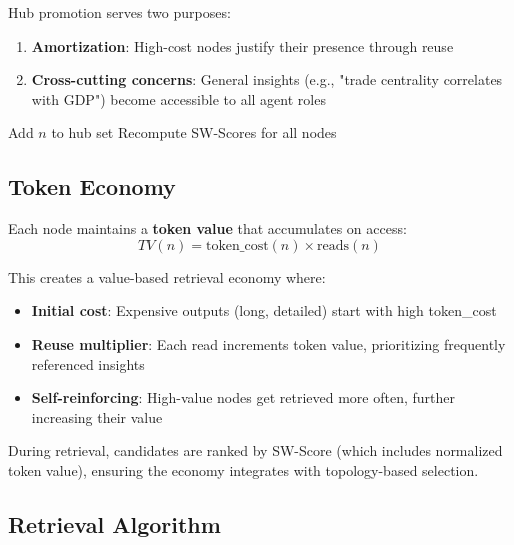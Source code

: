 \documentclass[11pt]{article}
\begin{document}
Hub promotion serves two purposes:
\begin{enumerate}
    \item \textbf{Amortization}: High-cost nodes justify their presence through reuse
    \item \textbf{Cross-cutting concerns}: General insights (e.g., "trade centrality correlates with GDP") become accessible to all agent roles
\end{enumerate}

\begin{algorithm}
\caption{Hub Promotion (called at epoch boundaries)}
\begin{algorithmic}[1]
        \STATE Add $n$ to hub set
    \ENDIF
\ENDFOR
\STATE Recompute SW-Scores for all nodes
\end{algorithmic}
\end{algorithm}

\subsection{Token Economy}

Each node maintains a \textbf{token value} that accumulates on access:
\begin{equation}
TV(n) = \text{token\_cost}(n) \times \text{reads}(n)
\end{equation}

This creates a value-based retrieval economy where:
\begin{itemize}
    \item \textbf{Initial cost}: Expensive outputs (long, detailed) start with high token\_cost
    \item \textbf{Reuse multiplier}: Each read increments token value, prioritizing frequently referenced insights
    \item \textbf{Self-reinforcing}: High-value nodes get retrieved more often, further increasing their value
\end{itemize}

During retrieval, candidates are ranked by SW-Score (which includes normalized token value), ensuring the economy integrates with topology-based selection.

\subsection{Retrieval Algorithm}
\end{document}
